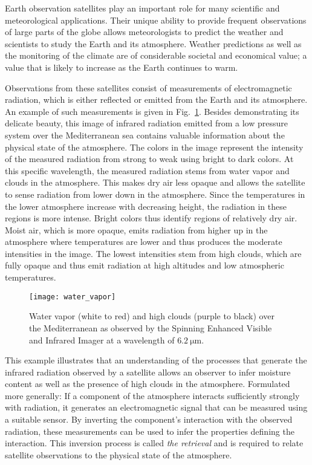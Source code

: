 
Earth observation satellites play an important role for many scientific and
meteorological applications. Their unique ability to provide frequent
observations of large parts of the globe allows meteorologists to predict the
weather and scientists to study the Earth and its atmosphere. Weather
predictions as well as the monitoring of the  climate are of considerable
societal and economical value; a value that is likely to increase as the 
Earth continues to warm.

Observations from these satellites consist of measurements of electromagnetic
radiation, which is either reflected or emitted from the Earth and its
atmosphere. An example of such measurements is given in
Fig.~\ref{fig:introduction:water_vapor}. Besides demonstrating its delicate
beauty, this image of infrared radiation emitted from a low pressure system over
the Mediterranean sea contains valuable information about the physical state of
the atmosphere. The colors in the image represent the intensity of the measured
radiation from strong to weak using bright to dark colors. At this specific
wavelength, the measured radiation stems from water vapor and clouds in the
atmosphere. This makes dry air less opaque and allows the satellite to sense
radiation from lower down in the atmosphere. Since the temperatures in the lower
atmosphere increase with decreasing height, the radiation in these regions is
more intense. Bright colors thus identify regions of relatively dry air. Moist
air, which is more opaque, emits radiation from higher up in the atmosphere
where temperatures are lower and thus produces the moderate intensities in the
image. The lowest intensities stem from high clouds, which are fully opaque and
thus emit radiation at  high altitudes and low atmospheric temperatures.

\begin{figure}[h!]
\centering
\texttt{[image: water\_vapor]}
\caption{Water vapor (white to red) and high clouds (purple to black) over the
Mediterranean as observed by the Spinning Enhanced Visible and Infrared
Imager at a wavelength of $\SI{6.2}{\micro \meter}$.}
\label{fig:introduction:water_vapor}
\end{figure}

This example illustrates that an understanding of the processes that generate
the infrared radiation observed by a satellite allows an observer to infer
moisture content as well as the presence of high clouds in the atmosphere.
Formulated more generally: If a component of the atmosphere interacts
sufficiently strongly with radiation, it generates an electromagnetic signal
that can be measured using a suitable sensor. By inverting the component's
interaction with the observed radiation, these measurements can be used to infer
the properties defining the interaction. This inversion process is
called \textit{the retrieval} and is required to relate satellite observations
to the physical state of the atmosphere.

